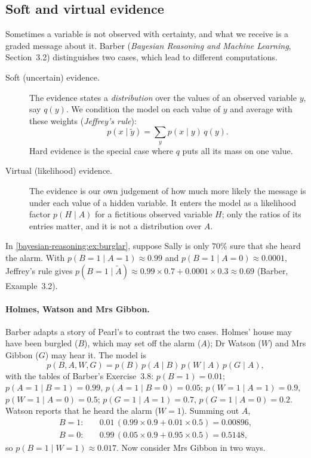\begin{notechapter}
\subsection{Soft and virtual evidence}

Sometimes a variable is not observed with certainty, and what we receive is a
graded message about it. Barber (\emph{Bayesian Reasoning and Machine Learning},
Section~3.2) distinguishes two cases, which lead to different computations.

\begin{description}
  \item[Soft (uncertain) evidence.] The evidence states a \emph{distribution} over
        the values of an observed variable $y$, say $q(y)$. We condition the model on
        each value of $y$ and average with these weights (\emph{Jeffrey's rule}):
        \[
          p(x\mid\tilde y) = \sum_yp(x\mid y)\,q(y).
        \]
        Hard evidence is the special case where $q$ puts all its mass on one value.
  \item[Virtual (likelihood) evidence.] The evidence is our own judgement of how
        much more likely the message is under each value of a hidden variable. It
        enters the model as a likelihood factor $p(H\mid A)$ for a fictitious
        observed variable $H$; only the ratios of its entries matter, and it is not
        a distribution over $A$.
\end{description}

\begin{example}
In \cref{bayesian-reasoning:ex:burglar}, suppose Sally is only $70\%$ sure that she
heard the alarm. With $p(B = 1\mid A = 1)\approx0.99$ and
$p(B = 1\mid A = 0)\approx0.0001$, Jeffrey's rule gives
$p(B = 1\mid\tilde A)\approx0.99\times0.7 + 0.0001\times0.3\approx0.69$ (Barber,
Example~3.2).
\end{example}

\paragraph{Holmes, Watson and Mrs Gibbon.} Barber adapts a story of Pearl's to
contrast the two cases. Holmes' house may have been burgled ($B$), which may set
off the alarm ($A$); Dr Watson ($W$) and Mrs Gibbon ($G$) may hear it. The model is
\[
  p(B,A,W,G) = p(B)\,p(A\mid B)\,p(W\mid A)\,p(G\mid A),
\]
with the tables of Barber's Exercise~3.8: $p(B = 1) = 0.01$;
$p(A = 1\mid B = 1) = 0.99$, $p(A = 1\mid B = 0) = 0.05$;
$p(W = 1\mid A = 1) = 0.9$, $p(W = 1\mid A = 0) = 0.5$;
$p(G = 1\mid A = 1) = 0.7$, $p(G = 1\mid A = 0) = 0.2$. Watson reports that he
heard the alarm ($W = 1$). Summing out $A$,
\begin{align*}
  B = 1:&\quad 0.01\,(0.99\times0.9 + 0.01\times0.5) = 0.00896,\\
  B = 0:&\quad 0.99\,(0.05\times0.9 + 0.95\times0.5) = 0.5148,
\end{align*}
so $p(B = 1\mid W = 1)\approx0.017$. Now consider Mrs Gibbon in two ways.


\end{notechapter}
